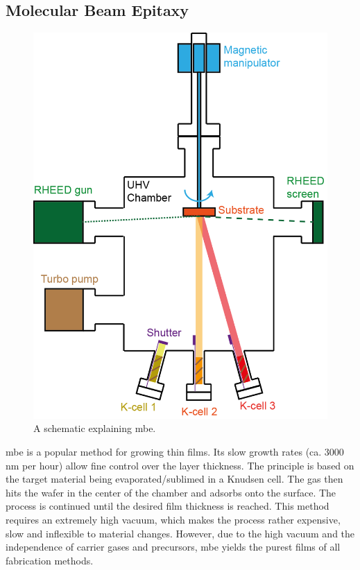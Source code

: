 \subsection{Molecular Beam Epitaxy} 
\begin{figure}
    \centering
    \includegraphics[scale=.7]{03_fabrication/fig/molecular_beam_epitaxy.png}
    \caption{A schematic explaining \gls{mbe}. \cite{Zeljkovic2015}}
    \label{fig:fabrication_mbe}
\end{figure}
\Gls{mbe} is a popular method for growing thin films. Its slow growth rates (ca. 3000 nm per hour) allow fine control over the layer thickness. The principle is based on the target material being evaporated/sublimed in a Knudsen cell. The gas then hits the wafer in the center of the chamber and adsorbs onto the surface. The process is continued until the desired film thickness is reached. This method requires an extremely high vacuum, which makes the process rather expensive, slow and inflexible to material changes.  However, due to the high vacuum and the independence of carrier gases and precursors, \gls{mbe} yields the purest films of all fabrication methods.
